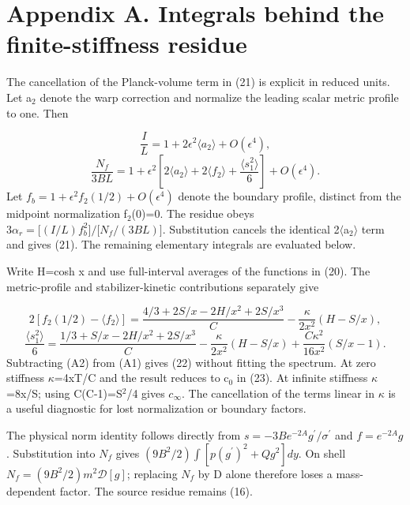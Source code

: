 \documentclass[11pt,a4paper]{article}
\begin{document}
\section*{Appendix A. Integrals behind the finite-stiffness residue}
The cancellation of the Planck-volume term in (21) is explicit in reduced units. Let a\ensuremath{{}_{2}} denote the warp correction and normalize the leading scalar metric profile to one. Then

\begin{equation}
\frac{I}{L}=1+2\epsilon^2\langle a_2\rangle+O(\epsilon^4),\tag{A0a}
\end{equation}
\begin{equation}
\frac{N_f}{3BL}=1+\epsilon^2\left[2\langle a_2\rangle+2\langle f_2\rangle+\frac{\langle s_1^2\rangle}{6}\right]+O(\epsilon^4).\tag{A0b}
\end{equation}
Let \ensuremath{f_b=1+\epsilon^2f_2(1/2)+O(\epsilon^4)} denote the boundary profile, distinct from the midpoint normalization f\ensuremath{{}_{2}}(0)=0. The residue obeys \ensuremath{3\alpha_r=\big[(I/L)f_b^2\big]/\big[N_f/(3BL)\big]}. Substitution cancels the identical 2\ensuremath{\langle}a\ensuremath{{}_{2}}\ensuremath{\rangle} term and gives (21). The remaining elementary integrals are evaluated below.

Write H=cosh x and use full-interval averages of the functions in (20). The metric-profile and stabilizer-kinetic contributions separately give

\begin{equation}
2[f_2(1/2)-\langle f_2\rangle]=\frac{4/3+2S/x-2H/x^2+2S/x^3}{C}-\frac{\kappa}{2x^2}(H-S/x),\tag{A1}
\end{equation}
\begin{equation}
\frac{\langle s_1^2\rangle}{6}=\frac{1/3+S/x-2H/x^2+2S/x^3}{C}-\frac{\kappa}{2x^2}(H-S/x)+\frac{C\kappa^2}{16x^2}(S/x-1).\tag{A2}
\end{equation}
Subtracting (A2) from (A1) gives (22) without fitting the spectrum. At zero stiffness \ensuremath{\kappa}=4xT/C and the result reduces to c\ensuremath{{}_{0}} in (23). At infinite stiffness \ensuremath{\kappa}=8x/S; using C(C-1)=S\ensuremath{{}^{2}}/4 gives \ensuremath{c_\infty}. The cancellation of the terms linear in \ensuremath{\kappa} is a useful diagnostic for lost normalization or boundary factors.

The physical norm identity follows directly from \ensuremath{s=-3Be^{-2A}g^{\prime}/\sigma^{\prime}} and \ensuremath{f=e^{-2A}g}. Substitution into \ensuremath{N_f} gives \ensuremath{(9B^2/2)\int[p(g^{\prime})^2+Qg^2]dy}. On shell \ensuremath{N_f=(9B^2/2)m^2\mathcal D[g]}; replacing \ensuremath{N_f} by D alone therefore loses a mass-dependent factor. The source residue remains (16).
\end{document}
